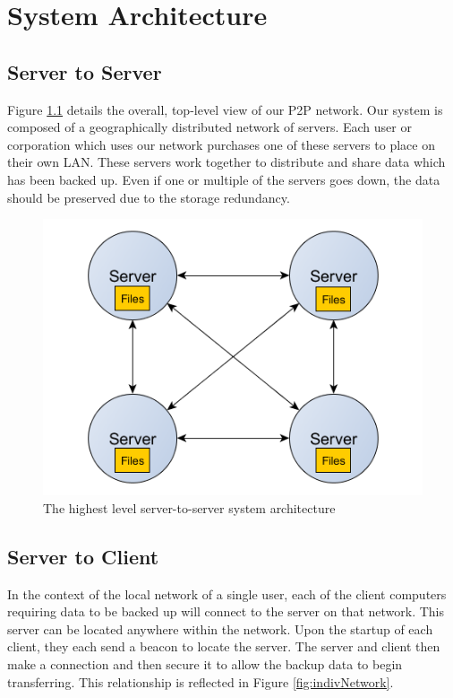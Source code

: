 \chapter{System Architecture}


\section{Server to Server}

Figure \ref{fig:highLvlNetwork} details the overall, top-level view of our P2P network.  Our system is composed of a geographically distributed network of servers.  Each user or corporation which uses our network purchases one of these servers to place on their own LAN.  These servers work together to distribute and share data which has been backed up.  Even if one or multiple of the servers goes down, the data should be preserved due to the storage redundancy.

\begin{figure}[hb]
\centering
\includegraphics[scale=0.5]{images/architechure-diagram-server-server.png}
\caption{The highest level server-to-server system architecture}
\label{fig:highLvlNetwork}
\end{figure}

\clearpage


\section{Server to Client}

In the context of the local network of a single user, each of the client computers requiring data to be backed up
will connect to the server on that network. This server can be located anywhere within the network.
Upon the startup of each client, they each send a beacon to locate the server. The server and client
then make a connection and then secure it to allow the backup data to begin transferring. This relationship is reflected in Figure \ref{fig:indivNetwork}.


